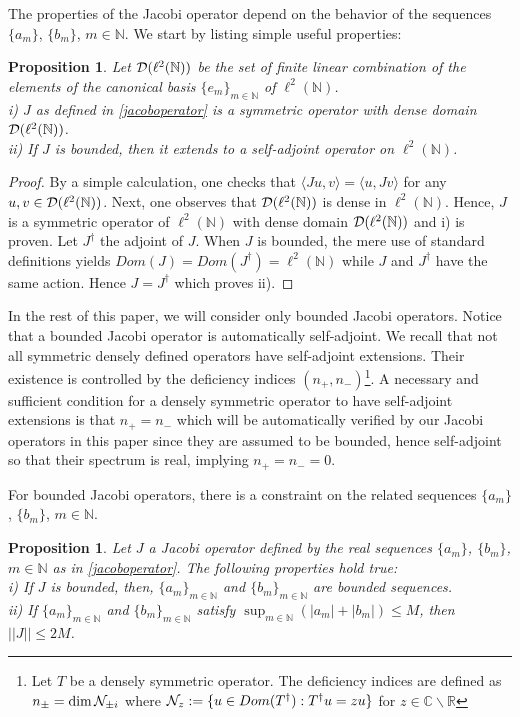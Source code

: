 \documentclass[a4paper,11pt,twoside]{article}
\numberwithin{equation}{section}
\newtheorem{proposition}[Theorem]{Proposition}
\theoremstyle{nonumberplain}
\newtheorem{proof}{Proof}
\newcounter{and}
\begin{document}
The properties of the Jacobi operator depend on the behavior of the sequences $\{a_m\}$, $\{b_m\}$, $m\in\mathbb{N}$. We start by listing simple useful properties:
\begin{proposition}\label{extend-self}
Let ${\cal{D}}(\ell^2(\mathbb{N}))$ be the set of finite linear combination of the elements of the canonical basis $\{e_m\}_{m\in\mathbb{N}}$ of $\ell^2(\mathbb{N})$.\\ i) $J$ as defined in \eqref{jacoboperator} is a symmetric operator with dense domain ${\cal{D}}(\ell^2(\mathbb{N}))$. \\
ii) If $J$ is bounded, then it extends to a self-adjoint operator on $\ell^2(\mathbb{N})$.
\end{proposition}
\begin{proof}
By a simple calculation, one checks that $\langle Ju,v \rangle=\langle u,Jv \rangle$ for any $u,v\in{\cal{D}}(\ell^2(\mathbb{N}))$. Next, one observes that ${\cal{D}}(\ell^2(\mathbb{N}))$ is dense in $\ell^2(\mathbb{N})$. Hence, $J$ is a symmetric operator of $\ell^2(\mathbb{N})$ with dense domain ${\cal{D}}(\ell^2(\mathbb{N}))$ and i) is proven. Let $J^\dag$ the adjoint of $J$. When $J$ is bounded, the mere use of standard definitions yields $Dom(J)=Dom(J^\dag)=\ell^2(\mathbb{N})$ while $J$ and $J^\dag$ have the same action. Hence 
$J=J^\dag$ which proves ii).
\end{proof}
In the rest of this paper, we will consider only bounded Jacobi operators. Notice that a bounded Jacobi operator is automatically self-adjoint. We recall that not all symmetric densely defined operators have self-adjoint extensions. Their existence is controlled by the deficiency indices $(n_+,n_-)${\footnote{Let $T$ be a densely symmetric operator. The deficiency indices are defined as $n_\pm=\dim{\cal{N}}_{\pm i}$ where ${\cal{N}}_z:=\{u\in Dom(T^\dag):T^\dag u=zu \}$ for $z\in\mathbb{C}\backslash\mathbb{R}$}}. A necessary and sufficient condition for a densely symmetric operator to have self-adjoint extensions is that $n_+=n_-$ which will be automatically verified by our Jacobi operators in this paper since they are  assumed to be bounded, hence self-adjoint so that their spectrum is real, implying $n_+=n_-=0$.\par
For bounded Jacobi operators, there is a constraint on the related sequences $\{a_m\}$, $\{b_m\}$, $m\in\mathbb{N}$.
\begin{proposition}\label{jaco-bounded}
Let $J$ a Jacobi operator defined by the real sequences $\{a_m\}$, $\{b_m\}$, $m\in\mathbb{N}$ as in \eqref{jacoboperator}. The following properties hold true:\\
i) If $J$ is bounded, then, $\{a_m\}_{m\in\mathbb{N}}$ and $\{b_m\}_{m\in\mathbb{N}}$ are bounded sequences.\\
ii) If $\{a_m\}_{m\in\mathbb{N}}$ and $\{b_m\}_{m\in\mathbb{N}}$ satisfy $\sup_{m\in\mathbb{N}}(|a_m|+|b_m|)\le M$, then $||J||\le2 M$.
\end{proposition}
\end{document}
